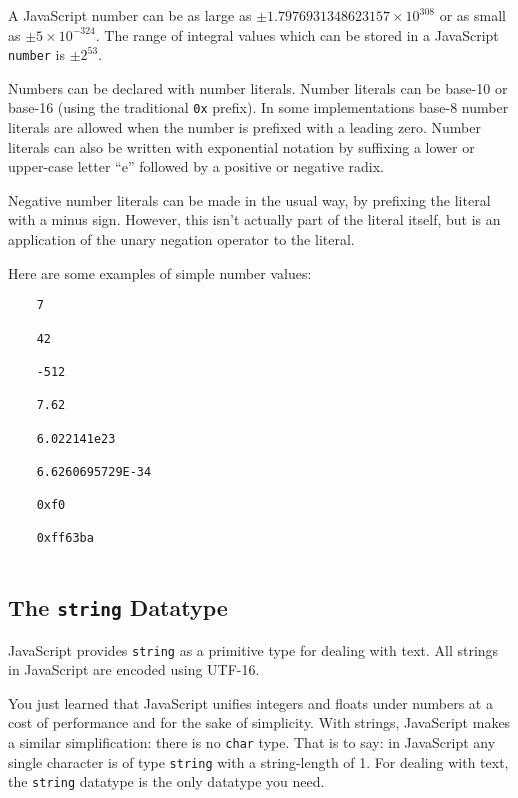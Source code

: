 \documentclass[11pt,letter]{book}
\begin{document}
    A JavaScript number can be as large as $\pm 1.7976931348623157 \times 10^{308}$ or as small as
    $\pm 5 \times 10^{-324}$. The range of integral values which can be stored in a JavaScript 
    \texttt{number} is $\pm 2^{53}$.
    
    Numbers can be declared with number literals. Number literals can be base-10 or base-16 (using 
    the traditional \texttt{0x} prefix). In some implementations base-8 number literals are allowed 
    when the number is prefixed with a leading zero. Number literals can also be written with 
    exponential notation by suffixing a lower or upper-case letter ``e'' followed by a positive or 
    negative radix. 
    
    Negative number literals can be made in the usual way, by prefixing the literal with a minus 
    sign. However, this isn't actually part of the literal itself, but is an application of the 
    unary negation operator to the literal.
    
    Here are some examples of simple number values:
    
    \begin{verbatim}
    7
    
    42
    
    -512
    
    7.62
    
    6.022141e23
    
    6.6260695729E-34
    
    0xf0
    
    0xff63ba
    
    \end{verbatim}
    
    \subsection{The \texttt{string} Datatype}
    JavaScript provides \texttt{string} as a primitive type for dealing with text. All strings in 
    JavaScript are encoded using UTF-16.
    
    You just learned that JavaScript unifies integers and floats under numbers at a cost of 
    performance and for the sake of simplicity. With strings, JavaScript makes a similar 
    simplification: there is no \texttt{char} type. That is to say: in JavaScript any single 
    character is of type \texttt{string} with a string-length of 1. For dealing with  
    text, the \texttt{string} datatype is the only datatype you need.
    
\end{document}
